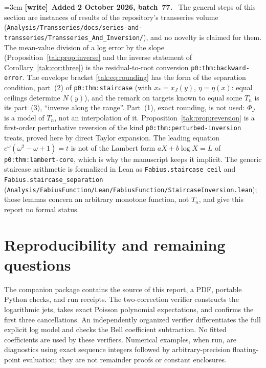 \documentclass[11pt,letterpaper]{article}
\theoremstyle{remark}\newtheorem{remark}[theorem]{Remark}
\newenvironment{writenote}[1][]{\par\smallskip\begingroup\small\emergencystretch=3em
 \noindent\textbf{[write]}\if\relax\detokenize{#1}\relax\else~\textbf{#1.}\fi\ }%
 {\par\endgroup\smallskip}
\begin{document}
\begin{writenote}[Added 2 October 2026, batch~77]
The general steps of this section are instances of results of the repository's
transseries volume
(\texttt{Analysis/\allowbreak Transseries/\allowbreak docs/\allowbreak series-\allowbreak and-\allowbreak transseries/\allowbreak Transseries\_And\_Inversion/}),
and no novelty is claimed for them. The mean-value division of a log error by
the slope (Proposition~\ref{tak:prop:inverse} and the inverse statement of
Corollary~\ref{tak:cor:three}) is the residual-to-root conversion
\texttt{p0:thm:backward-error}. The envelope bracket \eqref{tak:eq:rounding} has
the form of the separation condition, part~(2) of \texttt{p0:thm:staircase}
(with $x_\ast=x_J(y)$, $\eta=\eta(x)$: equal ceilings determine $N(y)$), and the
remark on targets known to equal some $T_n$ is its part~(3), ``inverse along the
range''. Part~(1), exact rounding, is not used: $\Phi_J$ is a model of $T_n$,
not an interpolation of it. Proposition~\ref{tak:prop:reversion} is a
first-order perturbative reversion of the kind \texttt{p0:thm:perturbed-inversion}
treats, proved here by direct Taylor expansion. The leading equation
$e^\omega(\omega^2-\omega+1)=t$ is not of the Lambert form
$aX+b\log X=L$ of \texttt{p0:thm:lambert-core}, which is why the manuscript
keeps it implicit. The generic staircase arithmetic is formalized in Lean as
\texttt{Fabius.staircase\_ceil} and \texttt{Fabius.staircase\_separation}
(\texttt{Analysis/\allowbreak FabiusFunction/\allowbreak Lean/\allowbreak FabiusFunction/\allowbreak StaircaseInversion.lean});
those lemmas concern an arbitrary monotone function, not $T_n$, and give this
report no formal status.
\end{writenote}

\section{Reproducibility and remaining questions}\label{tak:sec:repro}
The companion package contains the source of this report, a PDF, portable Python checks, and run receipts. The two-correction verifier constructs the logarithmic jets, takes exact Poisson polynomial expectations, and confirms the first three cancellations. An independently organized verifier differentiates the full explicit log model and checks the Bell coefficient subtraction. No fitted coefficients are used by these verifiers. Numerical examples, when run, are diagnostics using exact sequence integers followed by arbitrary-precision floating-point evaluation; they are not remainder proofs or constant enclosures.
\end{document}

